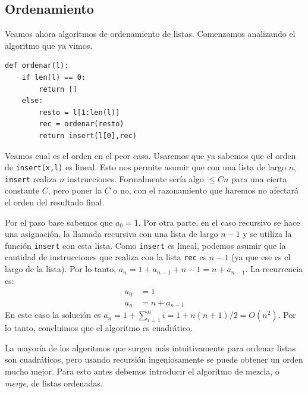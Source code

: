 \documentclass[a4paper, 12pt]{report}
\theoremstyle{definition}
\begin{document}
\subsection{Ordenamiento}

Veamos ahora algoritmos de ordenamiento de listas. Comenzamos analizando el algoritmo que ya vimos.
\begin{verbatim}
def ordenar(l):
    if len(l) == 0:
        return []
    else:
        resto = l[1:len(l)]
        rec = ordenar(resto)
        return insert(l[0],rec)
\end{verbatim}
Veamos cual es el orden en el peor caso. Usaremos que ya sabemos que el orden de {\tt insert(x,l)} es lineal. Esto nos permite asumir que con una lista de largo $n$, {\tt insert} realiza $n$ instrucciones. Formalmente sería algo $\leq Cn$ para una cierta constante $C$, pero poner la $C$ o no, con el razonamiento que haremos no afectará el orden del resultado final.

Por el paso base sabemos que $a_0=1$. Por otra parte, en el caso recursivo se hace una asignación, la llamada recursiva con una lista de largo $n-1$ y se utiliza la función {\tt insert} con esta lista. Como {\tt insert} es lineal, podemos asumir que la cantidad de instrucciones que realiza con la lista {\tt rec} es $n-1$ (ya que ese es el largo de la lista). Por lo tanto, $a_n = 1 + a_{n-1} + n-1 = n + a_{n-1}$. La recurrencia es:
\begin{align*}
	a_0 &= 1\\
	a_n &= n + a_{n-1}
\end{align*}
En este caso la solución es $a_n = 1 + \sum_{i=1}^{n}i = 1 + n(n+1)/2 = O(n^2)$. Por lo tanto, concluimos que el algoritmo es cuadrático.

La mayoría de los algoritmos que surgen más intuitivamente para ordenar listas son cuadráticos, pero usando recursión ingeniosamente se puede obtener un orden mucho mejor. Para esto antes debemos introducir el algoritmo de mezcla, o {\sl merge}, de listas ordenadas.
\end{document}
